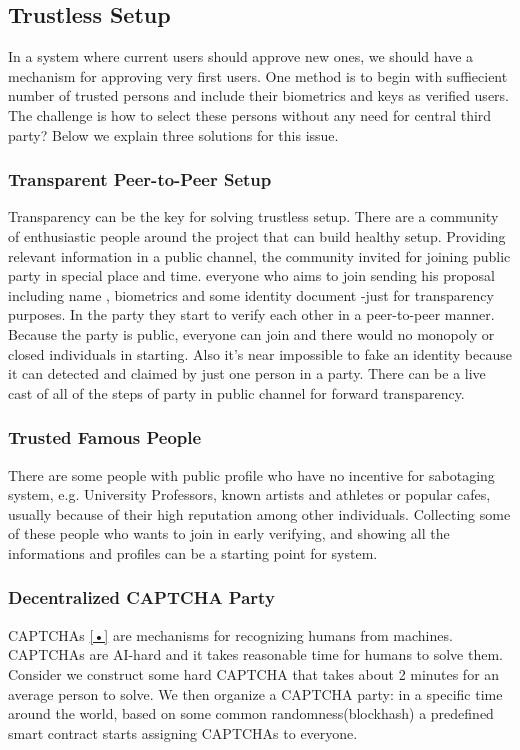 \documentclass{article}
\begin{document}
\subsection{Trustless Setup}
In a system where current users should approve new ones, we should have a mechanism for approving very first users. One method is to begin with suffiecient number of trusted persons and include their biometrics and keys as verified users. The challenge is how to select these persons without any need for central third party? Below we explain three solutions for this issue.

\subsubsection*{Transparent Peer-to-Peer Setup} 
Transparency can be the key for solving trustless setup. There are a community of enthusiastic people around the project that can build healthy setup. Providing relevant information in a public channel, the community invited for joining public party in special place and time. everyone who aims to join sending his proposal including name , biometrics and some identity document -just for transparency purposes. In the party they start to verify each other in a peer-to-peer manner. Because the party is public, everyone can join and there would no monopoly or closed individuals in starting. Also it's near impossible to fake an identity because it can detected and claimed by just one person in a party. There can be a live cast of all of the steps of party in public channel for forward transparency.

\subsubsection*{Trusted Famous People}
There are some people with public profile who have no incentive for sabotaging system, e.g. University Professors, known artists and athletes or popular cafes, usually because of their high reputation among other individuals. Collecting some of these people who wants to join in early verifying, and showing all the informations and profiles can be a starting point for system.

\subsubsection*{ Decentralized CAPTCHA Party}
CAPTCHAs {\ref{•}} are mechanisms for recognizing humans from machines. CAPTCHAs are AI-hard and it takes reasonable time for humans to solve them. Consider we construct some hard CAPTCHA that takes about 2 minutes for an average person to solve. We then organize a CAPTCHA party: in a specific time around the world, based on some common randomness(blockhash) a predefined smart contract starts assigning CAPTCHAs to everyone. 
\end{document}
